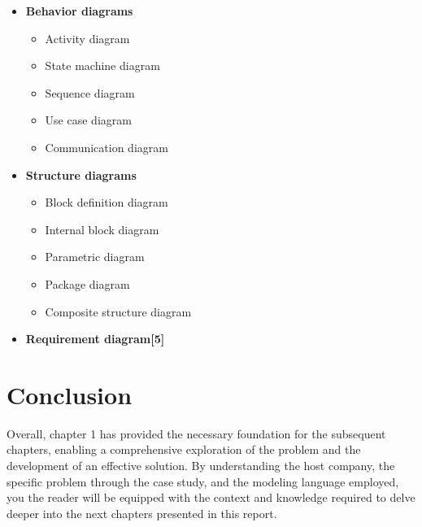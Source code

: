 \begin{itemize}
    \item \textbf{Behavior diagrams \cite{sysml_modeling}}
    \begin{itemize}
        \item Activity diagram
        \item State machine diagram
        \item Sequence diagram
        \item Use case diagram
        \item Communication diagram
    \end{itemize}

    \item \textbf{Structure diagrams \cite{sysml_modeling}}
    \begin{itemize}
        \item Block definition diagram
        \item Internal block diagram
        \item Parametric diagram
        \item Package diagram
        \item Composite structure diagram
    \end{itemize}

    \item \textbf{Requirement diagram[5]}
\end{itemize}

\section*{\fontsize{15}{18}\selectfont Conclusion}

\hspace*{\parindent}Overall, chapter 1 has provided the necessary foundation for the subsequent chapters, enabling a
comprehensive exploration of the problem and the development of an effective solution. By understanding the host company, the specific problem through the case study, and the modeling language
employed, you the reader will be equipped with the context and knowledge required to delve deeper
into the next chapters presented in this report.